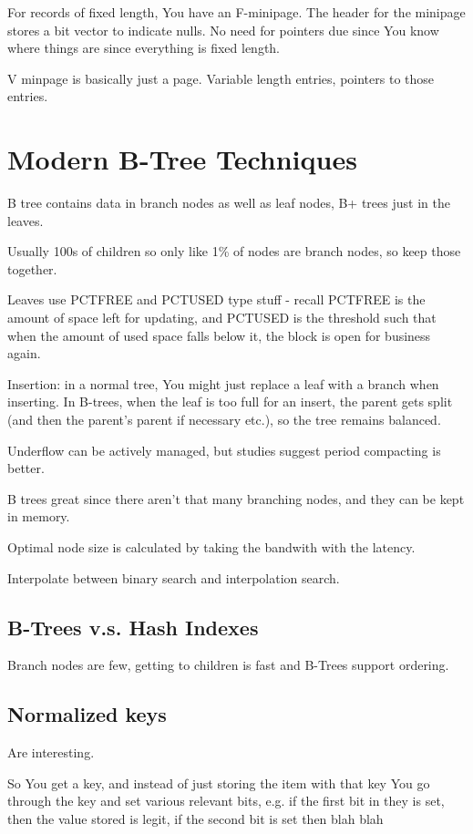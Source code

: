 \documentclass{article}
\begin{document}
	For records of fixed length, You have an F-minipage. The header for the minipage stores a bit vector to indicate nulls. No need for pointers due since You know where things are since everything is fixed length.
	
	V minpage is basically just a page. Variable length entries, pointers to those entries.
	
\newpage
\section{Modern B-Tree Techniques}

	B tree contains data in branch nodes as well as leaf nodes, B+ trees just in the leaves.
	
	Usually 100s of children so only like 1\% of nodes are branch nodes, so keep those together.
	
	Leaves use PCTFREE and PCTUSED type stuff - recall PCTFREE is the amount of space left for updating, and PCTUSED is the threshold such that when the amount of used space falls below it, the block is open for business again.

	Insertion: in a normal tree, You might just replace a leaf with a branch when inserting. In B-trees, when the leaf is too full for an insert, the parent gets split (and then the parent's parent if necessary etc.), so the tree remains balanced.
	
	Underflow can be actively managed, but studies suggest period compacting is better.
	
	B trees great since there aren't that many branching nodes, and they can be kept in memory.
	
	Optimal node size is calculated by taking the bandwith with the latency.
	
	Interpolate between binary search and interpolation search.
	
	\subsection{B-Trees v.s. Hash Indexes}
	
		Branch nodes are few, getting to children is fast and B-Trees support ordering.
		
	\subsection{Normalized keys}
	
		Are interesting.
		
		So You get a key, and instead of just storing the item with that key You go through the key and set various relevant bits, e.g. if the first bit in they is set, then the value stored is legit, if the second bit is set then blah blah
		
\end{document}
